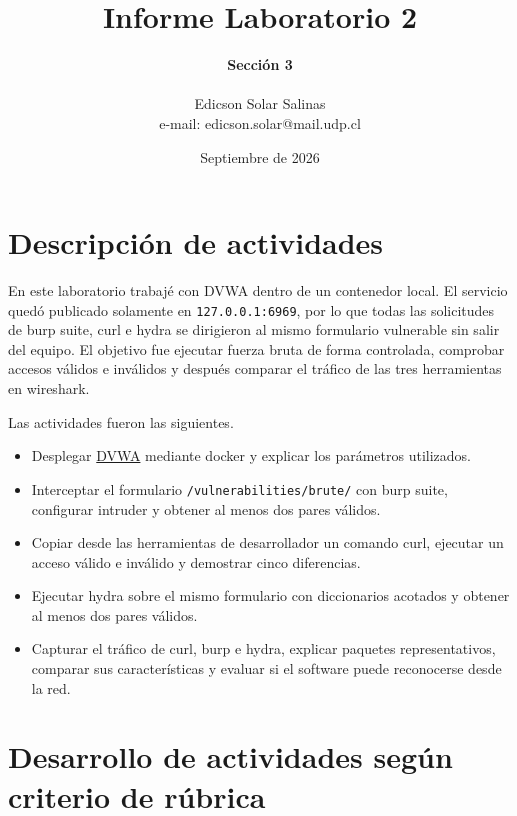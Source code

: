 \documentclass[letterpaper,12pt]{article}
\begin{document}
%
   \title{\Huge{Informe Laboratorio 2}}

   \author{\textbf{Sección 3} \\  \\Edicson Solar Salinas \\ e-mail: edicson.solar@mail.udp.cl}
          
   \date{Septiembre de 2026}

   \maketitle
   
   \tableofcontents
 
  \newpage

\section{Descripción de actividades}

En este laboratorio trabajé con DVWA dentro de un contenedor local. El servicio quedó
publicado solamente en \texttt{127.0.0.1:6969}, por lo que todas las solicitudes de burp
suite, curl e hydra se dirigieron al mismo formulario vulnerable sin salir del equipo. El
objetivo fue ejecutar fuerza bruta de forma controlada, comprobar accesos válidos e
inválidos y después comparar el tráfico de las tres herramientas en wireshark.

Las actividades fueron las siguientes.

\begin{itemize}
  \item Desplegar \href{https://github.com/digininja/DVWA}{DVWA} mediante docker y
  explicar los parámetros utilizados.
  \item Interceptar el formulario \texttt{/vulnerabilities/brute/} con burp suite,
  configurar intruder y obtener al menos dos pares válidos.
  \item Copiar desde las herramientas de desarrollador un comando curl, ejecutar un
  acceso válido e inválido y demostrar cinco diferencias.
  \item Ejecutar hydra sobre el mismo formulario con diccionarios acotados y obtener al
  menos dos pares válidos.
  \item Capturar el tráfico de curl, burp e hydra, explicar paquetes representativos,
  comparar sus características y evaluar si el software puede reconocerse desde la red.
\end{itemize}

\section{Desarrollo de actividades según criterio de rúbrica}
\end{document}

